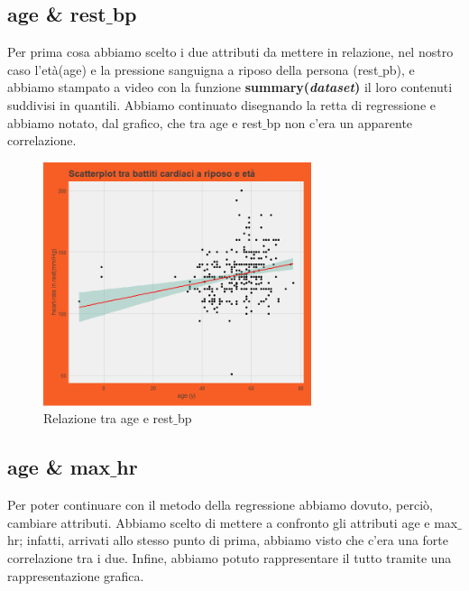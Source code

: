 \documentclass{article}
\begin{document}
\subsection { age \& rest$\_$bp }
Per prima cosa abbiamo scelto i due attributi da mettere in relazione, nel nostro caso l'età(age) e la pressione sanguigna a riposo della persona (rest$\_$pb), e abbiamo stampato a video con la funzione \textbf{summary(\textit{dataset})} il loro contenuti suddivisi in quantili. Abbiamo continuato disegnando la retta di regressione e abbiamo notato, dal grafico, che tra age e rest$\_$bp non c’era un apparente correlazione.

\begin{figure}[h]
	\centering
	\includegraphics[width=0.7\textwidth]{age e restbp.png}
	\caption{Relazione tra age e rest$\_$bp}
	\label {fig:ds1}
\end{figure}
\newpage

\subsection { age \& max$\_$hr }
Per poter continuare con il metodo della regressione abbiamo dovuto, perciò, cambiare attributi. Abbiamo scelto di mettere a confronto gli attributi age e max$\_$hr; infatti, arrivati allo stesso punto di prima, abbiamo visto che c’era una forte correlazione tra i due. Infine, abbiamo potuto rappresentare il tutto tramite una rappresentazione grafica. 
\end{document}
